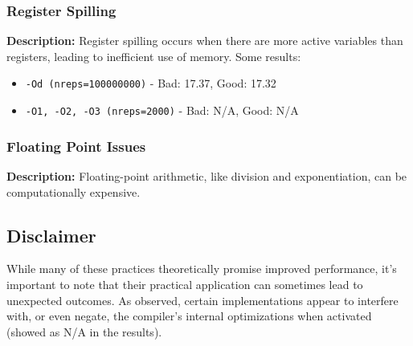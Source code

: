\subsubsection*{Register Spilling}
\textbf{Description:} Register spilling occurs when there are more active variables than registers, leading to inefficient use of memory. Some results:
\begin{itemize}[itemsep=0.3ex]
    \item \texttt{-Od (nreps=100000000)} - Bad: 17.37, Good: 17.32
    \item \texttt{-O1, -O2, -O3 (nreps=2000)} - Bad: N/A, Good: N/A
\end{itemize}

\subsubsection{Floating Point Issues}
\textbf{Description:} Floating-point arithmetic, like division and exponentiation, can be computationally expensive.

\subsection*{Disclaimer}
While many of these practices theoretically promise improved performance, it's important to note that their practical application can sometimes lead to unexpected outcomes. As observed, certain implementations appear to interfere with, or even negate, the compiler's internal optimizations when activated (showed as N/A in the results).
